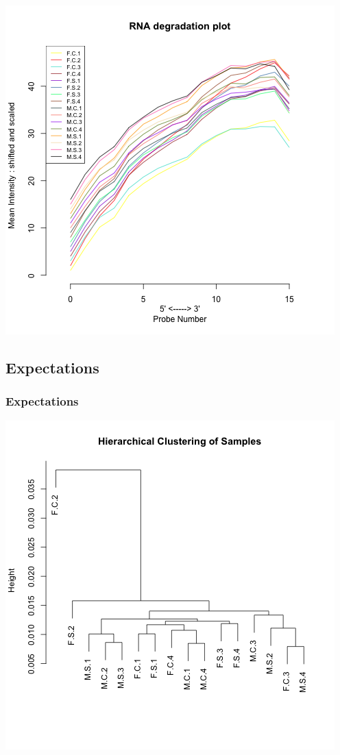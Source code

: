 \documentclass[pdf]{beamer}
\begin{document}
\begin{frame}
  \begin{center}
  \includegraphics[scale=0.5]{figures/Figure2.png} 
  \end{center}
\end{frame}

\subsection{Expectations} 

\begin{frame}
  \frametitle{Expectations}  
  \begin{center}
  \includegraphics[scale=0.5]{figures/Figure3.png} 
  \end{center}
\end{frame}
\end{document}
